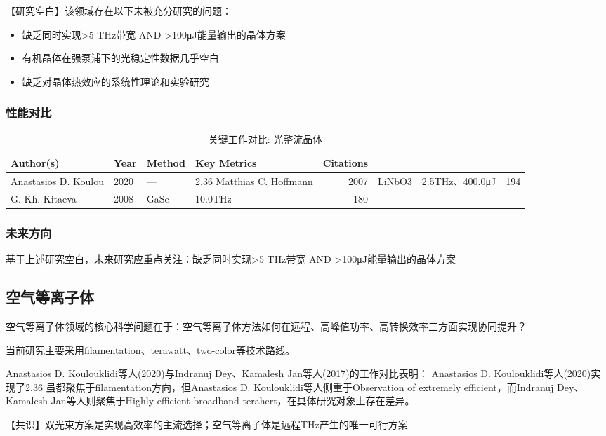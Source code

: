 \documentclass[reprint,amsmath,amssymb,aps,floatfix]{revtex4-2}
\begin{document}
\par\par{【研究空白】该领域存在以下未被充分研究的问题：}
\begin{itemize}
\item 缺乏同时实现>5 THz带宽 AND >100μJ能量输出的晶体方案
\item 有机晶体在强泵浦下的光稳定性数据几乎空白
\item 缺乏对晶体热效应的系统性理论和实验研究
\end{itemize}

\subsubsection*{性能对比}
\begin{table}[h!]
\caption{关键工作对比: 光整流晶体}
\begin{tabular}{@{}llp{2.5cm}p{2.5cm}r@{}}
\hline
Author(s) & Year & Method & Key Metrics & Citations\\
\hline
Anastasios D. Koulou & 2020 & --- & 2.36%
Matthias C. Hoffmann & 2007 & LiNbO3 & 2.5THz、400.0μJ & 194\\
G. Kh. Kitaeva & 2008 & GaSe & 10.0THz & 180\\
\hline
\end{tabular}
\end{table}

\subsubsection*{未来方向}
基于上述研究空白，未来研究应重点关注：缺乏同时实现>5 THz带宽 AND >100μJ能量输出的晶体方案

\subsection{空气等离子体}
\par\par{空气等离子体领域的核心科学问题在于：空气等离子体方法如何在远程、高峰值功率、高转换效率三方面实现协同提升？}

\par\par{当前研究主要采用filamentation、terawatt、two-color等技术路线。}
\par\par{Anastasios D. Koulouklidi等人(2020)与Indranuj Dey、Kamalesh Jan等人(2017)的工作对比表明：}
Anastasios D. Koulouklidi等人(2020)实现了2.36%
虽都聚焦于filamentation方向，但Anastasios D. Koulouklidi等人侧重于Observation of extremely efficient，而Indranuj Dey、Kamalesh Jan等人则聚焦于Highly efficient broadband terahert，在具体研究对象上存在差异。
\par\par{【共识】双光束方案是实现高效率的主流选择；空气等离子体是远程THz产生的唯一可行方案}
\end{document}
